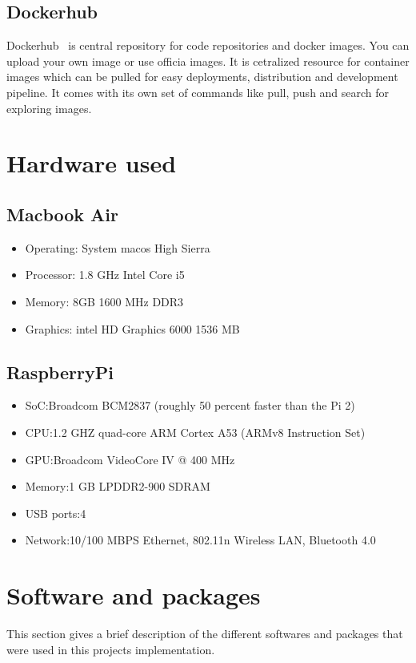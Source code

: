 \subsection{Dockerhub}

Dockerhub~\cite{hid-sp18-413-dockerhub} is central repository for
code repositories and docker images. You can upload your own image or
use officia images. It is cetralized resource for container images
which can be pulled for easy deployments, distribution and development
pipeline. It comes with its own set of commands like pull, push and
search for exploring images.

\section{Hardware used}
\subsection{Macbook Air}
\begin{itemize}
\item Operating: System macos High Sierra
\item Processor: 1.8 GHz Intel Core i5
\item Memory: 8GB 1600 MHz DDR3
\item Graphics: intel HD Graphics 6000 1536 MB
\end{itemize}

\subsection{RaspberryPi}
\begin{itemize}
\item SoC:Broadcom BCM2837 (roughly 50 percent faster than the Pi 2)
\item CPU:1.2 GHZ quad-core ARM Cortex A53 (ARMv8 Instruction Set)
\item GPU:Broadcom VideoCore IV @ 400 MHz
\item Memory:1 GB LPDDR2-900 SDRAM
\item USB ports:4
\item Network:10/100 MBPS Ethernet, 802.11n Wireless LAN, Bluetooth
  4.0
\end{itemize}

\section{Software and packages}
This section gives a brief description of the different softwares and
packages that were used in this projects implementation.


